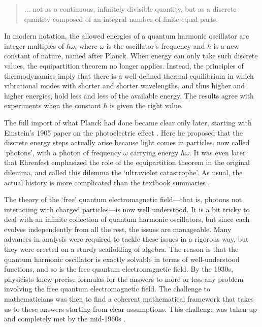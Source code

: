 \documentclass{article}
\begin{document}
\begin{quote}
... not as a continuous, infinitely divisible quantity, but as a discrete quantity composed of an integral number of finite equal parts.
\end{quote}

In modern notation, the allowed energies of a quantum harmonic oscillator are integer multiples of $\hbar \omega$, where $\omega$ is the oscillator's frequency and $\hbar$ is a new constant of nature, named after Planck.   When energy can only take such discrete values, the equipartition theorem no longer applies.  Instead, the principles of thermodynamics imply that there is a well-defined thermal equilibrium in which vibrational modes with shorter and shorter wavelengths, and thus higher and higher energies, hold less and less of the available energy.   The results agree with experiments when the constant $\hbar$ is given the right value.

The full import of what Planck had done became clear only later, starting with Einstein's 1905 paper on the photoelectric effect \cite{Einstein}.  Here he proposed that the discrete energy steps actually arise because light comes in particles, now called `photons', with a photon of frequency $\omega$ carrying energy $\hbar \omega$.   It was even later that Ehrenfest emphasized the role of the equipartition theorem in the original dilemma, and called this dilemma the `ultraviolet catastrophe'.  As usual, the actual history is more complicated than the textbook summaries \cite{Kragh}.

The theory of the `free' quantum electromagnetic field---that is, photons not interacting with charged particles---is now well understood.   It is a bit tricky to deal with an infinite collection of quantum harmonic oscillators, but since each evolves independently from all the rest, the issues are manageable.  Many advances in analysis were required to tackle these issues in a rigorous way, but they were erected on a sturdy scaffolding of algebra.  The reason is that the quantum harmonic oscillator is exactly solvable in terms of well-understood functions, and so is the free quantum electromagnetic field.   By the 1930s,  physicists knew precise formulas for the answers to more or less any problem involving the free quantum electromagnetic field.  The challenge to mathematicians was then to find a coherent mathematical framework that takes us to these answers starting from clear assumptions.  This challenge was taken up and completely met by the mid-1960s \cite{BSZ}.
\end{document}
